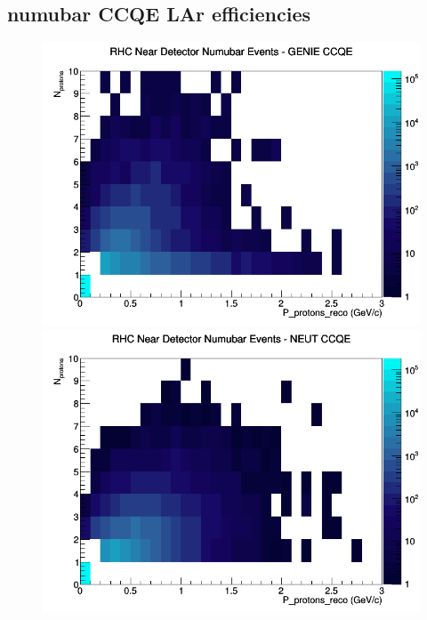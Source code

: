 \subsection{numubar CCQE LAr efficiencies}
\begin{figure}[h]
\includegraphics[width=\linewidth]{eff_N_P/LAr/protons/CCQE_RHC_ND_numubar_N_P_GENIE.png}
\endminipage
{}
\includegraphics[width=\linewidth]{eff_N_P/LAr/protons/CCQE_RHC_ND_numubar_N_P_NEUT.png}
\endminipage
{}

\end{figure}
